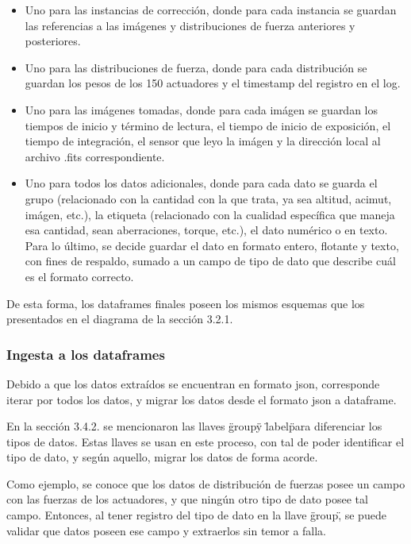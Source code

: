 \begin{itemize}

    \item Uno para las instancias de corrección, donde para cada instancia se guardan las referencias a las imágenes y distribuciones de fuerza anteriores y posteriores.

    \item Uno para las distribuciones de fuerza, donde para cada distribución se guardan los pesos de los 150 actuadores y el timestamp del registro en el log.

    \item Uno para las imágenes tomadas, donde para cada imágen se guardan los tiempos de inicio y término de lectura, el tiempo de inicio de exposición, el tiempo de integración, el sensor que leyo la imágen y la dirección local al archivo .fits correspondiente.

    \item Uno para todos los datos adicionales, donde para cada dato se guarda el grupo (relacionado con la cantidad con la que trata, ya sea altitud, acimut, imágen, etc.), la etiqueta (relacionado con la cualidad específica que maneja esa cantidad, sean aberraciones, torque, etc.), el dato numérico o en texto. Para lo último, se decide guardar el dato en formato entero, flotante y texto, con fines de respaldo, sumado a un campo de tipo de dato que describe cuál es el formato correcto.
    
\end{itemize}

De esta forma, los dataframes finales poseen los mismos esquemas que los presentados en el diagrama de la sección 3.2.1.

\subsubsection{Ingesta a los dataframes}

Debido a que los datos extraídos se encuentran en formato json, corresponde iterar por todos los datos, y migrar los datos desde el formato json a dataframe.

En la sección 3.4.2. se mencionaron las llaves \"group\" y \"label\" para diferenciar los tipos de datos. Estas llaves se usan en este proceso, con tal de poder identificar el tipo de dato, y según aquello, migrar los datos de forma acorde.

Como ejemplo, se conoce que los datos de distribución de fuerzas posee un campo con las fuerzas de los actuadores, y que ningún otro tipo de dato posee tal campo. Entonces, al tener registro del tipo de dato en la llave \"group\", se puede validar que datos poseen ese campo y extraerlos sin temor a falla.

